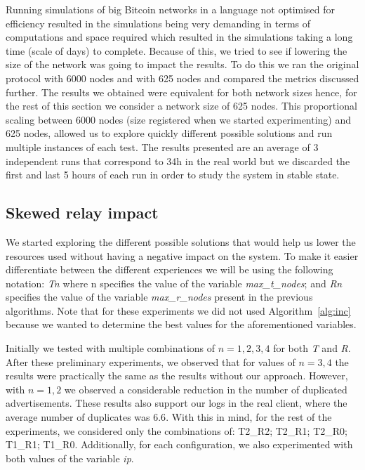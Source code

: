 \documentclass{dads}   %
\begin{document}
Running simulations of big Bitcoin networks in a language not optimised for efficiency resulted in the simulations being very demanding in terms of computations and space required which resulted in the simulations taking a long time (scale of days) to complete. Because of this, we tried to see if lowering the size of the network was going to impact the results. To do this we ran the original protocol with 6000 nodes and with 625 nodes and compared the metrics discussed further. The results we obtained were equivalent for both network sizes hence, for the rest of this section we consider a network size of 625 nodes. This proportional scaling between 6000 nodes (size registered when we started experimenting) and 625 nodes, allowed us to explore quickly different possible solutions and run multiple instances of each test. The results presented are an average of 3 independent runs that correspond to 34h in the real world but we discarded the first and last 5 hours of each run in order to study the system in stable state.


\subsection{Skewed relay impact}
\label{sec:sri}
We started exploring the different possible solutions that would help us lower the resources used without having a negative impact on the system. To make it easier differentiate between the different experiences we will be using the following notation: \textsl{Tn} where n specifies the value of the variable \textsl{max\_t\_nodes}; and \textsl{Rn} specifies the value of the variable \textsl{max\_r\_nodes} present in the previous algorithms. Note that for these experiments we did not used Algorithm~\ref{alg:inc} because we wanted to determine the best values for the aforementioned variables.

Initially we tested with multiple combinations of $n={1,2,3,4}$ for both \textsl{T} and \textsl{R}. After these preliminary experiments, we observed that for values of $n={3,4}$ the results were practically the same as the results without our approach. However, with $n={1,2}$ we observed a considerable reduction in the number of duplicated advertisements.
These results also support our logs in the real client, where the average number of duplicates was $6.6$. With this in mind, for the rest of the experiments, we considered only the combinations of: T2\_R2; T2\_R1; T2\_R0; T1\_R1; T1\_R0. Additionally, for each configuration, we also experimented with both values of the variable \textsl{ip}.
\end{document}
